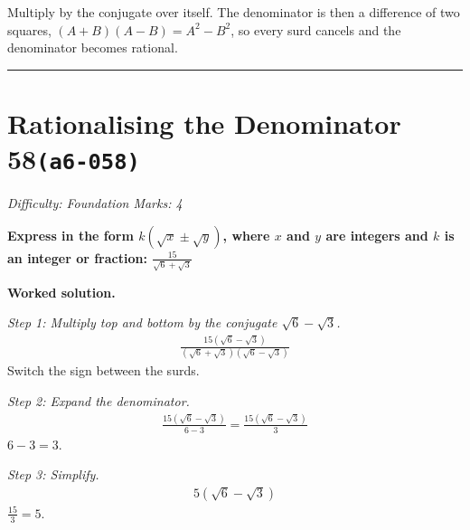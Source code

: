 \documentclass[11pt]{article}
\newcommand{\question}[1]{\par\medskip\noindent\textbf{#1}\par}
\begin{document}
\begin{center}
\end{center}
\small Multiply by the conjugate over itself. The denominator is then a difference of two squares, $(A+B)(A-B)=A^{2}-B^{2}$, so every surd cancels and the denominator becomes rational.\normalsize

\medskip\hrule

\section*{Rationalising the Denominator 58\quad\small\texttt{(a6-058)}}
\textit{Difficulty: Foundation \quad\textbar\quad Marks: 4}

\question{Express in the form \( k(\sqrt{x} \pm \sqrt{y}) \), where \( x \) and \( y \) are integers and \( k \) is an integer or fraction: \( \frac{15}{\sqrt{6} + \sqrt{3}} \)}

\textbf{Worked solution.}

\textit{Step 1: Multiply top and bottom by the conjugate \( \sqrt{6} - \sqrt{3} \).}
\[\begin{gathered}
\frac{15(\sqrt{6} - \sqrt{3})}{(\sqrt{6} + \sqrt{3})(\sqrt{6} - \sqrt{3})}
\end{gathered}\]
Switch the sign between the surds.

\textit{Step 2: Expand the denominator.}
\[\begin{gathered}
\frac{15(\sqrt{6} - \sqrt{3})}{6 - 3} = \frac{15(\sqrt{6} - \sqrt{3})}{3}
\end{gathered}\]
\( 6 - 3 = 3 \).

\textit{Step 3: Simplify.}
\[\begin{gathered}
5(\sqrt{6} - \sqrt{3})
\end{gathered}\]
\( \frac{15}{3} = 5 \).
\end{document}
